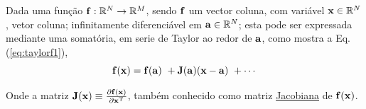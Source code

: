 \begin{proposition}\label{prop:taylorf}
Dada uma função  $\VECTOR{f}:\mathbb{R}^{N}\rightarrow \mathbb{R}^{M}$, 
sendo $\VECTOR{f}$ um vector coluna, com variável $\VECTOR{x} \in \mathbb{R}^{N}$, vetor coluna;
infinitamente diferenciável em $\VECTOR{a} \in \mathbb{R}^{N}$;
esta pode ser expressada mediante uma somatória, em serie de Taylor 
\cite[pp. 393]{levine1999control} \cite{Taylor} ao redor de $\VECTOR{a}$, como
mostra a Eq. (\ref{eq:taylorf1}),
\begin{equation}\label{eq:taylorf1}
\VECTOR{f}(\VECTOR{x}) =\VECTOR{f}(\VECTOR{a})
      ~+ \MATRIX{J}(\VECTOR{a}) (\VECTOR{x}-\VECTOR{a})
      ~+\cdots 
\end{equation}

Onde a matriz $\MATRIX{J}(\VECTOR{x})\equiv \frac{\partial \VECTOR{f}(\VECTOR{x})}{\partial \VECTOR{x}^{\transpose} }$,
também conhecido como matriz \hyperref[def:jacobian]{Jacobiana} de $\VECTOR{f}(\VECTOR{x})$.
\end{proposition}
